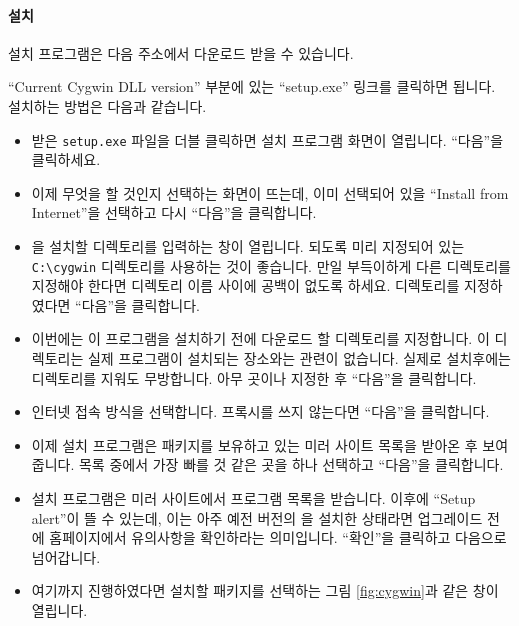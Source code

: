 \paragraph{\CYGWIN{} 설치} \CYGWIN{} 설치 프로그램은 다음 주소에서
다운로드 받을 수 있습니다.

\begin{center}
\end{center}

``Current Cygwin DLL version'' 부분에 있는 ``setup.exe'' 링크를 클릭하면
됩니다. 설치하는 방법은 다음과 같습니다.

\begin{itemize}
\item 받은 \texttt{setup.exe} 파일을 더블 클릭하면 설치 프로그램 화면이
  열립니다. ``다음''을 클릭하세요.
\item 이제 무엇을 할 것인지 선택하는 화면이 뜨는데, 이미 선택되어 있을
  ``Install from Internet''을 선택하고 다시 ``다음''을 클릭합니다.
\item \CYGWIN{}을 설치할 디렉토리를 입력하는 창이 열립니다. 되도록 미리
  지정되어 있는 \texttt{C:\textbackslash cygwin} 디렉토리를 사용하는 것이
  좋습니다. 만일 부득이하게 다른 디렉토리를 지정해야 한다면 디렉토리 이름
  사이에 공백이 없도록 하세요. 디렉토리를 지정하였다면 ``다음''을 클릭합니다.
\item 이번에는 \CYGWIN{}이 \UNIX{} 프로그램을 설치하기 전에 다운로드 할
  디렉토리를 지정합니다. 이 디렉토리는 실제 \UNIX{} 프로그램이 설치되는
  장소와는 관련이 없습니다. 실제로 설치후에는 디렉토리를 지워도
  무방합니다. 아무 곳이나 지정한 후 ``다음''을 클릭합니다.
\item 인터넷 접속 방식을 선택합니다. 프록시를 쓰지 않는다면 ``다음''을
  클릭합니다.
\item 이제 설치 프로그램은 \CYGWIN{} 패키지를 보유하고 있는 미러 사이트 목록을
  받아온 후 보여줍니다. 목록 중에서 가장 빠를 것 같은 곳을 하나
  선택하고 ``다음''을 클릭합니다.
\item 설치 프로그램은 미러 사이트에서 프로그램 목록을 받습니다. 이후에 ``Setup
  alert''이 뜰 수 있는데, 이는 아주 예전 버전의 \CYGWIN{}을 설치한 상태라면
  업그레이드 전에 홈페이지에서 유의사항을 확인하라는 의미입니다. ``확인''을
  클릭하고 다음으로 넘어갑니다.
\item 여기까지 진행하였다면 설치할 \CYGWIN{} 패키지를 선택하는 그림
  \ref{fig:cygwin}과 같은 창이 열립니다.
  \begin{figure}[t]
    \centering

\end{figure}
\end{itemize}
